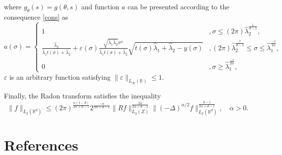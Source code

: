 \documentclass[12pt]{iopart}
\begin{document}
where $g_{\theta}(s)=g(\theta,s)$ and function $a$ can be presented according to the consequence \ref{cons} as
$$
a(\sigma)=
  \begin{cases}
    1& ,\sigma\le (2\pi)\widehat\lambda_2^\frac{1}{d-1},\\
    \frac{\widehat\lambda_2}{\widehat\lambda_1t(\sigma)+\widehat\lambda_2}+\varepsilon(\sigma)\frac{\sqrt{\widehat\lambda_1\widehat\lambda_2}\sigma^\alpha}{\widehat\lambda_1t(\sigma)+\widehat\lambda_2}\sqrt{t(\sigma)\widehat\lambda_1+\widehat\lambda_2-y(\sigma)}& ,(2\pi)\widehat\lambda_2^\frac{1}{d-1} \le\sigma\le\widehat\lambda_1^{\frac{-1}{2\alpha}},\\
    0 &,\sigma\ge\widehat\lambda_1^{\frac{-1}{2\alpha}},
  \end{cases}
$$
$\varepsilon$ is an arbitrary function satisfying $\|\varepsilon\|_{L_\infty(\mathbb R)}\le 1$.

Finally, the Radon transform satisfies the inequality
$$
\|f\|_{L_2(\mathbb R^d)}\leqslant
(2\pi)^{\frac{\alpha(1-d)}{2\alpha+d-1}}2^{\frac{-\alpha}{2\alpha+d-1}}\|Rf\|_{L_2(Z)}^{\frac{2\alpha}{2\alpha+d-1}}\|(-\Delta)^{\alpha/2}f\|_{L_2(\mathbb
  R^d)}^\frac{d-1}{2\alpha+d-1},\quad \alpha>0.
$$




\section*{References}


\end{document}
